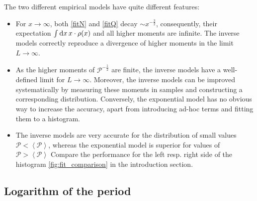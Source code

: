 \documentclass[11pt,a4paper]{article}
\renewcommand{\d}{\textnormal{d}}
\newcommand{\period}{\mathcal P}
\renewcommand{\|}{\rule[-0.4ex]{0.2ex}{1.2em}}
\begin{document}
The two different empirical models have quite different features:
\begin{itemize}
	\item For $x\rightarrow\infty$, both   \cref{fitN} and \cref{fitQ} decay   $\sim x^{-\frac 3 2}$, consequently, their expectation $\int \d x \, x\cdot \rho(x)$ and all higher moments are infinite. The inverse models correctly reproduce a divergence of higher moments in the limit $L \rightarrow \infty$.
	\item As the higher moments of $\period^{-\frac 12}$ are  finite, the inverse models have a well-defined limit  for $L \rightarrow \infty$. Moreover, the inverse models can be improved systematically by measuring these moments in samples and constructing a corresponding distribution. Conversely, the exponential model has no obvious way to increase the accuracy, apart from introducing ad-hoc terms and fitting them to a histogram.
	\item The inverse models are very accurate for the distribution of small values $\period<\left \langle \period \right \rangle  $, whereas the exponential model is superior for values of $\period>\left \langle \period \right \rangle  $ Compare the performance for the left resp. right side of the histogram \cref{fig:fit_comparison} in the introduction section. 
\end{itemize}













\FloatBarrier




\subsection{Logarithm of the period}\label{sec:logarithm}
\end{document}
